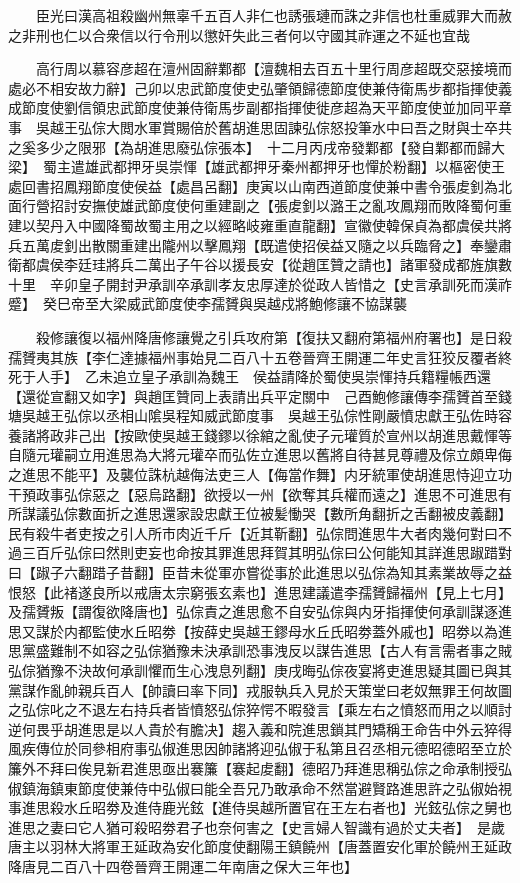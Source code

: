 　　臣光曰漢高祖殺幽州無辜千五百人非仁也誘張璉而誅之非信也杜重威罪大而赦之非刑也仁以合衆信以行令刑以懲奸失此三者何以守國其祚運之不延也宜哉

　　高行周以慕容彦超在澶州固辭鄴都【澶魏相去百五十里行周彦超既交惡接境而處必不相安故力辭】己卯以忠武節度使史弘肇領歸德節度使兼侍衛馬步都指揮使義成節度使劉信領忠武節度使兼侍衛馬步副都指揮使徙彦超為天平節度使並加同平章事　吳越王弘倧大閲水軍賞賜倍於舊胡進思固諫弘倧怒投筆水中曰吾之財與士卒共之奚多少之限邪【為胡進思廢弘倧張本】　十二月丙戌帝發鄴都【發自鄴都而歸大梁】　蜀主遣雄武都押牙吳崇惲【雄武都押牙秦州都押牙也憚於粉翻】以樞密使王處回書招鳳翔節度使侯益【處昌呂翻】庚寅以山南西道節度使兼中書令張䖍釗為北面行營招討安撫使雄武節度使何重建副之【張䖍釗以潞王之亂攻鳳翔而敗降蜀何重建以契丹入中國降蜀故蜀主用之以經略岐雍重直龍翻】宣徽使韓保貞為都虞侯共將兵五萬䖍釗出散關重建出隴州以擊鳳翔【既遣使招侯益又隨之以兵臨脅之】奉鑾肅衛都虞侯李廷珪將兵二萬出子午谷以援長安【從趙匡贊之請也】諸軍發成都旌旗數十里　辛卯皇子開封尹承訓卒承訓孝友忠厚達於從政人皆惜之【史言承訓死而漢祚蹙】　癸巳帝至大梁威武節度使李孺贇與吳越戍將鮑修讓不協謀襲

　　殺修讓復以福州降唐修讓覺之引兵攻府第【復扶又翻府第福州府署也】是日殺孺贇夷其族【李仁達據福州事始見二百八十五卷晉齊王開運二年史言狂狡反覆者終死于人手】　乙未追立皇子承訓為魏王　侯益請降於蜀使吳崇惲持兵籍糧帳西還【還從宣翻又如字】與趙匡贊同上表請出兵平定關中　己酉鮑修讓傳李孺贇首至錢塘吳越王弘倧以丞相山隂吳程知威武節度事　吳越王弘倧性剛嚴憤忠獻王弘佐時容養諸將政非己出【按歐使吳越王錢鏐以徐綰之亂使子元瓘質於宣州以胡進思戴惲等自隨元瓘嗣立用進思為大將元瓘卒而弘佐立進思以舊將自待甚見尊禮及倧立頗卑侮之進思不能平】及襲位誅杭越侮法吏三人【侮當作舞】内牙統軍使胡進思恃迎立功干預政事弘倧惡之【惡烏路翻】欲授以一州【欲奪其兵權而遠之】進思不可進思有所謀議弘倧數面折之進思還家設忠獻王位被髪慟哭【數所角翻折之舌翻被皮義翻】民有殺牛者吏按之引人所市肉近千斤【近其靳翻】弘倧問進思牛大者肉幾何對曰不過三百斤弘倧曰然則吏妄也命按其罪進思拜賀其明弘倧曰公何能知其詳進思踧踖對曰【踧子六翻踖子昔翻】臣昔未從軍亦嘗從事於此進思以弘倧為知其素業故辱之益恨怒【此禇遂良所以戒唐太宗窮張玄素也】進思建議遣李孺贇歸福州【見上七月】及孺贇叛【謂復欲降唐也】弘倧責之進思愈不自安弘倧與内牙指揮使何承訓謀逐進思又謀於内都監使水丘昭劵【按薛史吳越王鏐母水丘氏昭劵蓋外戚也】昭劵以為進思黨盛難制不如容之弘倧猶豫未決承訓恐事洩反以謀告進思【古人有言需者事之賊弘倧猶豫不決故何承訓懼而生心洩息列翻】庚戌晦弘倧夜宴將吏進思疑其圖已與其黨謀作亂帥親兵百人【帥讀曰率下同】戎服執兵入見於天策堂曰老奴無罪王何故圖之弘倧叱之不退左右持兵者皆憤怒弘倧猝愕不暇發言【乘左右之憤怒而用之以順討逆何畏乎胡進思是以人貴於有膽决】趨入義和院進思鎖其門矯稱王命告中外云猝得風疾傳位於同參相府事弘俶進思因帥諸將迎弘俶于私第且召丞相元德昭德昭至立於簾外不拜曰俟見新君進思亟出褰簾【褰起䖍翻】德昭乃拜進思稱弘倧之命承制授弘俶鎮海鎮東節度使兼侍中弘俶曰能全吾兄乃敢承命不然當避賢路進思許之弘俶始視事進思殺水丘昭劵及進侍鹿光鉉【進侍吳越所置官在王左右者也】光鉉弘倧之舅也進思之妻曰它人猶可殺昭劵君子也奈何害之【史言婦人智識有過於丈夫者】　是歲唐主以羽林大將軍王延政為安化節度使翻陽王鎮饒州【唐蓋置安化軍於饒州王延政降唐見二百八十四卷晉齊王開運二年南唐之保大三年也】

